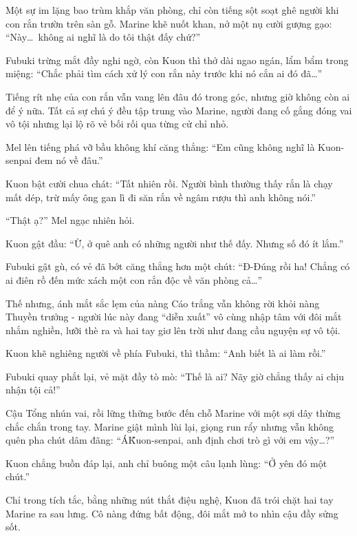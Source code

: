 \documentclass[../main.tex]{subfiles}
\begin{document}
Một sự im lặng bao trùm khắp văn phòng, chỉ còn tiếng sột soạt ghê người khi con rắn trườn trên sàn gỗ. Marine khẽ nuốt khan, nở một nụ cười gượng gạo: ``Này\dots\ không ai nghĩ là do tôi thật đấy chứ?''

Fubuki trừng mắt đầy nghi ngờ, còn Kuon thì thở dài ngao ngán, lẩm bẩm trong miệng: ``Chắc phải tìm cách xử lý con rắn này trước khi nó cắn ai đó đã\dots''

Tiếng rít nhẹ của con rắn vẫn vang lên đâu đó trong góc, nhưng giờ không còn ai để ý nữa. Tất cả sự chú ý đều tập trung vào Marine, người đang cố gắng đóng vai vô tội nhưng lại lộ rõ vẻ bối rối qua từng cử chỉ nhỏ.

Mel lên tiếng phá vỡ bầu không khí căng thẳng: ``Em cũng không nghĩ là Kuon-senpai đem nó về đâu.''

Kuon bật cười chua chát: ``Tất nhiên rồi. Người bình thường thấy rắn là chạy mất dép, trừ mấy ông gan lì đi săn rắn về ngâm rượu thì anh không nói.''

``Thật ạ?'' Mel ngạc nhiên hỏi.

Kuon gật đầu: ``Ừ, ở quê anh có những người như thế đấy. Nhưng số đó ít lắm.''

Fubuki gật gù, có vẻ đã bớt căng thẳng hơn một chút: ``Đ-Đúng rồi ha! Chẳng có ai điên rồ đến mức xách một con rắn độc về văn phòng cả\dots''

Thế nhưng, ánh mắt sắc lẹm của nàng Cáo trắng vẫn không rời khỏi nàng Thuyền trưởng - người lúc này đang ``diễn xuất'' vô cùng nhập tâm với đôi mắt nhắm nghiền, lưỡi thè ra và hai tay giơ lên trời như đang cầu nguyện sự vô tội.


Kuon khẽ nghiêng người về phía Fubuki, thì thầm: ``Anh biết là ai làm rồi.''

Fubuki quay phắt lại, vẻ mặt đầy tò mò: ``Thế là ai? Nãy giờ chẳng thấy ai chịu nhận tội cả!''

Cậu Tổng nhún vai, rồi lững thững bước đến chỗ Marine với một sợi dây thừng chắc chắn trong tay. Marine giật mình lùi lại, giọng run rẩy nhưng vẫn không quên pha chút dâm đãng: ``Á\~ Kuon-senpai, anh định chơi trò gì với em vậy\dots?''

Kuon chẳng buồn đáp lại, anh chỉ buông một câu lạnh lùng: ``Ở yên đó một chút.''

\ct

Chỉ trong tích tắc, bằng những nút thắt điệu nghệ, Kuon đã trói chặt hai tay Marine ra sau lưng. Cô nàng đứng bất động, đôi mắt mở to nhìn cậu đầy sửng sốt.
\end{document}
